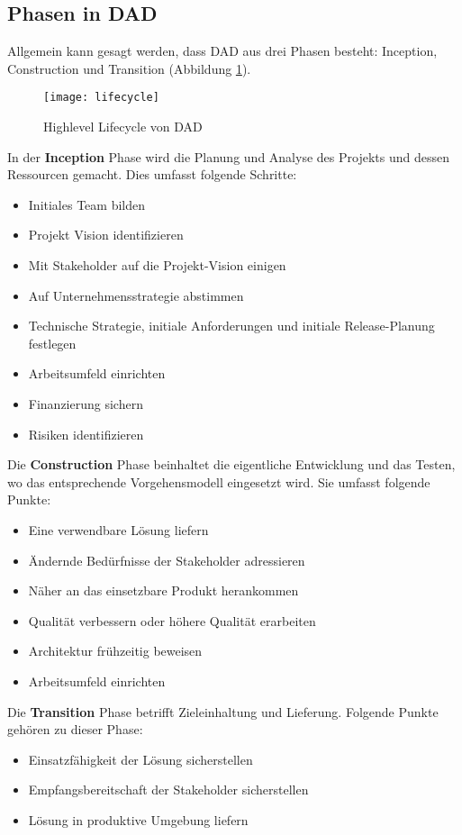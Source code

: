 \subsection{Phasen in DAD}
Allgemein kann gesagt werden, dass DAD aus drei Phasen besteht: Inception, Construction und Transition (Abbildung \ref{fig:highlevellifecycle}). \smallskip
\begin{figure}[H]
	\centering
	\texttt{[image: lifecycle]}
	\caption{Highlevel Lifecycle von DAD\cite{lifecycleDAD}}
	\label{fig:highlevellifecycle}
\end{figure}\medskip
In der \textbf{Inception} Phase wird die Planung und Analyse des Projekts und dessen Ressourcen gemacht. Dies umfasst folgende Schritte:\smallskip
\begin{itemize}
	\item Initiales Team bilden
	\item Projekt Vision identifizieren
	\item Mit Stakeholder auf die Projekt-Vision einigen
	\item Auf Unternehmensstrategie abstimmen
	\item Technische Strategie, initiale Anforderungen und initiale Release-Planung festlegen
	\item Arbeitsumfeld einrichten
	\item Finanzierung sichern
	\item Risiken identifizieren
\end{itemize}
\medskip
Die \textbf{Construction} Phase beinhaltet die eigentliche Entwicklung und das Testen, wo das entsprechende Vorgehensmodell eingesetzt wird. Sie umfasst folgende Punkte:\smallskip
\begin{itemize}
	\item Eine verwendbare Lösung liefern
	\item Ändernde Bedürfnisse der Stakeholder adressieren 
	\item Näher an das einsetzbare Produkt herankommen
	\item Qualität verbessern oder höhere Qualität erarbeiten
	\item Architektur frühzeitig beweisen
	\item Arbeitsumfeld einrichten
\end{itemize}\medskip
Die \textbf{Transition} Phase betrifft Zieleinhaltung und Lieferung. Folgende Punkte gehören zu dieser Phase:
\begin{itemize}
	\item Einsatzfähigkeit der Lösung sicherstellen
	\item Empfangsbereitschaft der Stakeholder sicherstellen
	\item Lösung in produktive Umgebung liefern
\end{itemize}
\medskip

